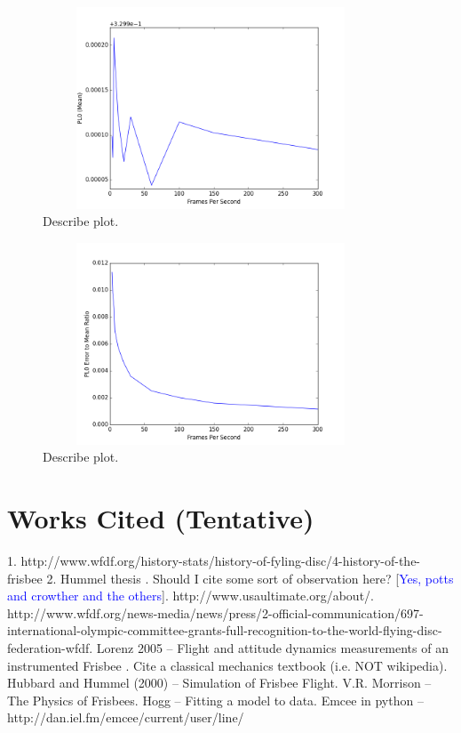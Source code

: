 \documentclass[a4paper,12pt, oneside]{article}
\newcommand{\blue}[1]{\textcolor{blue}{#1}}
\begin{document}
\begin{figure}[H]
        \includegraphics[width=10cm, height=6cm]{meanvsFPS}
	\centering
	\caption{\color{red} Describe plot.}
\end{figure}

\begin{figure}[H]
        \includegraphics[width=10cm, height=6cm]{errortomeanratiovsFPS}
	\centering
	\caption{\color{red} Describe plot.}
\end{figure}



\section{Works Cited (Tentative)}

1. http://www.wfdf.org/history-stats/history-of-fyling-disc/4-history-of-the-frisbee
2. Hummel thesis . Should I cite some sort of observation here? [\blue{Yes, potts and crowther and the others}]. http://www.usaultimate.org/about/. http://www.wfdf.org/news-media/news/press/2-official-communication/697-international-olympic-committee-grants-full-recognition-to-the-world-flying-disc-federation-wfdf. Lorenz 2005 -- Flight and attitude dynamics measurements of an instrumented Frisbee . Cite a classical mechanics textbook (i.e. NOT wikipedia). Hubbard and Hummel (2000) -- Simulation of Frisbee Flight. V.R. Morrison -- The Physics of Frisbees. Hogg -- Fitting a model to data. Emcee in python -- http://dan.iel.fm/emcee/current/user/line/\newline
\end{document}
